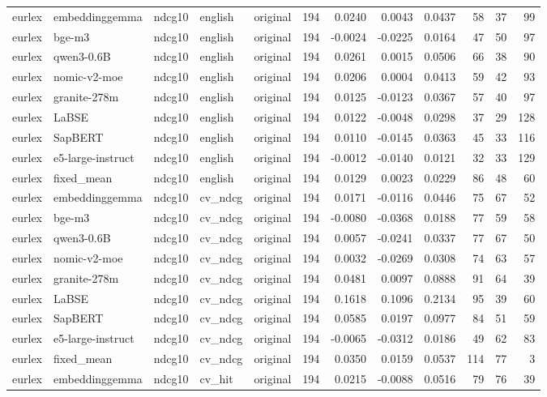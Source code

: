 \begin{tabular}{lllllrrrrrrr}
eurlex & embeddinggemma & ndcg10 & english & original & 194 & 0.0240 & 0.0043 & 0.0437 & 58 & 37 & 99 \\
eurlex & bge-m3 & ndcg10 & english & original & 194 & -0.0024 & -0.0225 & 0.0164 & 47 & 50 & 97 \\
eurlex & qwen3-0.6B & ndcg10 & english & original & 194 & 0.0261 & 0.0015 & 0.0506 & 66 & 38 & 90 \\
eurlex & nomic-v2-moe & ndcg10 & english & original & 194 & 0.0206 & 0.0004 & 0.0413 & 59 & 42 & 93 \\
eurlex & granite-278m & ndcg10 & english & original & 194 & 0.0125 & -0.0123 & 0.0367 & 57 & 40 & 97 \\
eurlex & LaBSE & ndcg10 & english & original & 194 & 0.0122 & -0.0048 & 0.0298 & 37 & 29 & 128 \\
eurlex & SapBERT & ndcg10 & english & original & 194 & 0.0110 & -0.0145 & 0.0363 & 45 & 33 & 116 \\
eurlex & e5-large-instruct & ndcg10 & english & original & 194 & -0.0012 & -0.0140 & 0.0121 & 32 & 33 & 129 \\
eurlex & fixed\_mean & ndcg10 & english & original & 194 & 0.0129 & 0.0023 & 0.0229 & 86 & 48 & 60 \\
eurlex & embeddinggemma & ndcg10 & cv\_ndcg & original & 194 & 0.0171 & -0.0116 & 0.0446 & 75 & 67 & 52 \\
eurlex & bge-m3 & ndcg10 & cv\_ndcg & original & 194 & -0.0080 & -0.0368 & 0.0188 & 77 & 59 & 58 \\
eurlex & qwen3-0.6B & ndcg10 & cv\_ndcg & original & 194 & 0.0057 & -0.0241 & 0.0337 & 77 & 67 & 50 \\
eurlex & nomic-v2-moe & ndcg10 & cv\_ndcg & original & 194 & 0.0032 & -0.0269 & 0.0308 & 74 & 63 & 57 \\
eurlex & granite-278m & ndcg10 & cv\_ndcg & original & 194 & 0.0481 & 0.0097 & 0.0888 & 91 & 64 & 39 \\
eurlex & LaBSE & ndcg10 & cv\_ndcg & original & 194 & 0.1618 & 0.1096 & 0.2134 & 95 & 39 & 60 \\
eurlex & SapBERT & ndcg10 & cv\_ndcg & original & 194 & 0.0585 & 0.0197 & 0.0977 & 84 & 51 & 59 \\
eurlex & e5-large-instruct & ndcg10 & cv\_ndcg & original & 194 & -0.0065 & -0.0312 & 0.0186 & 49 & 62 & 83 \\
eurlex & fixed\_mean & ndcg10 & cv\_ndcg & original & 194 & 0.0350 & 0.0159 & 0.0537 & 114 & 77 & 3 \\
eurlex & embeddinggemma & ndcg10 & cv\_hit & original & 194 & 0.0215 & -0.0088 & 0.0516 & 79 & 76 & 39 \\

\end{tabular}
